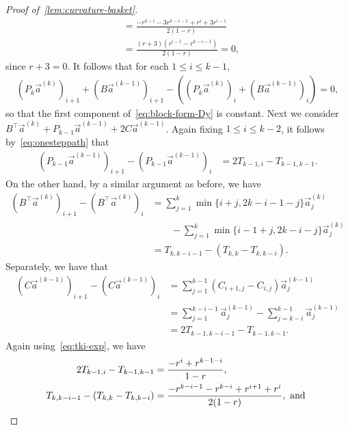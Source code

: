 \documentclass[11pt,a4paper]{article}
\begin{document}
\begin{proof}[Proof of~\cref{lem:curvature-basket}]
\begin{align*}
                &= \frac{-r^{k-i} - 3r^{k-i-1} +r^{i} +3r^{i-1}}{2(1-r)}\\
                &=\frac{(r+3)(r^{i-1} - r^{k-i-1})}{2(1-r)} = 0,
            \end{align*}
        since $r+3 = 0$. It follows that for each $1\leq i \leq k-1$,
            \begin{align*}
                (P_k\vec{a}^{(k)})_{i+1} + ({B}\vec{a}^{(k-1)})_{i+1} - \left((P_k\vec{a}^{(k)})_{i}  + ({B}\vec{a}^{(k-1)})_{i}\right) = 0,
            \end{align*}
        so that the first component of~\cref{eq:block-form-Dy} is constant. Next we consider ${B}^\top \vec{a}^{(k)} + {P}_{k-1}\vec{a}^{(k-1)} + 2{C}\vec{a}^{(k-1)}$. Again fixing $1\leq i \leq k-2$, it follows by~\cref{eq:onesteppath} that
            \begin{align*}
                ({P}_{k-1}\vec{a}^{(k-1)})_{i+1} - ({P}_{k-1}\vec{a}^{(k-1)})_{i} &= 2 T_{k-1, i} - T_{k-1, k-1}.
            \end{align*}
        On the other hand, by a similar argument as before, we have
            \begin{align*}
                ({B}^\top \vec{a}^{(k)})_{i+1} - ({B}^\top \vec{a}^{(k)})_{i} &= \sum_{j=1}^{k} \min\{ i + j , 2k - i -1 - j \} \vec{a}^{(k)}_{j}\\
                &\qquad - \sum_{j=1}^{k} \min\{ i -1 + j , 2k - i - j \} \vec{a}^{(k)}_{j}\\
                &= T_{k, k-i-1} - (T_{k, k} - T_{k, k-i}).
            \end{align*}
        Separately, we have that
            \begin{align*}
                ({C}\vec{a}^{(k-1)})_{i+1} - ({C}\vec{a}^{(k-1)})_{i} &= \sum_{j=1}^{k-1}({C}_{i + 1, j} - {C}_{i, j})\vec{a}^{(k-1)}_{j}\\
                &= \sum_{j=1}^{k-i-1} \vec{a}^{(k-1)}_{j} - \sum_{j=k-i}^{k-1} \vec{a}^{(k-1)}_{j}\\
                &= 2T_{k-1,k-i-1} -T_{k-1, k-1}.
            \end{align*}
        Again using~\cref{eq:tki-exp}, we have
            \begin{align}\label{eq:exp-part2}
                2 T_{k-1, i} - T_{k-1, k-1} &= \frac{- r^{i} + r^{k-1-i}}{1-r},\notag\\
                T_{k, k-i-1} - (T_{k, k} - T_{k, k-i}) &= \frac{-r^{k-i-1} - r^{k-i} + r^{i+1} + r^{i}}{ 2(1-r)},\text{ and }\notag\\

\end{align}
\end{proof}
\end{document}
